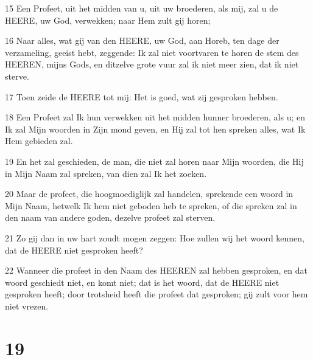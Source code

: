\par 15 Een Profeet, uit het midden van u, uit uw broederen, als mij, zal u de HEERE, uw God, verwekken; naar Hem zult gij horen;
\par 16 Naar alles, wat gij van den HEERE, uw God, aan Horeb, ten dage der verzameling, geeist hebt, zeggende: Ik zal niet voortvaren te horen de stem des HEEREN, mijns Gods, en ditzelve grote vuur zal ik niet meer zien, dat ik niet sterve.
\par 17 Toen zeide de HEERE tot mij: Het is goed, wat zij gesproken hebben.
\par 18 Een Profeet zal Ik hun verwekken uit het midden hunner broederen, als u; en Ik zal Mijn woorden in Zijn mond geven, en Hij zal tot hen spreken alles, wat Ik Hem gebieden zal.
\par 19 En het zal geschieden, de man, die niet zal horen naar Mijn woorden, die Hij in Mijn Naam zal spreken, van dien zal Ik het zoeken.
\par 20 Maar de profeet, die hoogmoediglijk zal handelen, sprekende een woord in Mijn Naam, hetwelk Ik hem niet geboden heb te spreken, of die spreken zal in den naam van andere goden, dezelve profeet zal sterven.
\par 21 Zo gij dan in uw hart zoudt mogen zeggen: Hoe zullen wij het woord kennen, dat de HEERE niet gesproken heeft?
\par 22 Wanneer die profeet in den Naam des HEEREN zal hebben gesproken, en dat woord geschiedt niet, en komt niet; dat is het woord, dat de HEERE niet gesproken heeft; door trotsheid heeft die profeet dat gesproken; gij zult voor hem niet vrezen.

\chapter{19}

